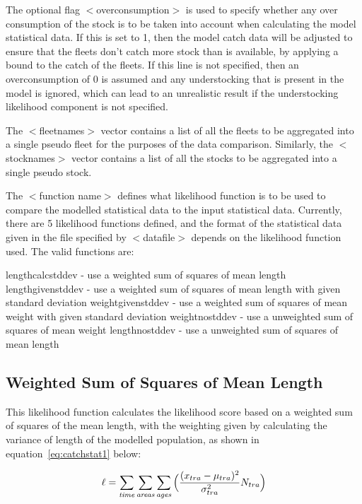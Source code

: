 \documentclass[10pt,twoside]{book}
\begin{document}
The optional flag $<$overconsumption$>$ is used to specify whether any over consumption of the stock is to be taken into account when calculating the model statistical data.  If this is set to 1, then the model catch data will be adjusted to ensure that the fleets don't catch more stock than is available, by applying a bound to the catch of the fleets.  If this line is not specified, then an overconsumption of 0 is assumed and any understocking that is present in the model is ignored, which can lead to an unrealistic result if the understocking likelihood component is not specified.

\bigskip
The $<$fleetnames$>$ vector contains a list of all the fleets to be aggregated into a single pseudo fleet for the purposes of the data comparison.  Similarly, the $<$stocknames$>$ vector contains a list of all the stocks to be aggregated into a single pseudo stock.

\bigskip
The $<$function name$>$ defines what likelihood function is to be used to compare the modelled statistical data to the input statistical data.  Currently, there are 5 likelihood functions defined, and the format of the statistical data given in the file specified by $<$datafile$>$ depends on the likelihood function used.  The valid functions are:

\bigskip
lengthcalcstddev - use a weighted sum of squares of mean length\newline
lengthgivenstddev - use a weighted sum of squares of mean length with given standard deviation\newline
weightgivenstddev - use a weighted sum of squares of mean weight with given standard deviation\newline
weightnostddev - use a unweighted sum of squares of mean weight\newline
lengthnostddev - use a unweighted sum of squares of mean length

\subsection{Weighted Sum of Squares of Mean Length}
This likelihood function calculates the likelihood score based on a weighted sum of squares of the mean length, with the weighting given by calculating the variance of length of the modelled population, as shown in equation~\ref{eq:catchstat1} below:

\begin{equation}\label{eq:catchstat1}
\ell = \sum_{\it time}\sum_{\it areas}\sum_{\it ages} \Big(\frac{(x_{tra}-\mu_{tra})^2} {\sigma_{tra}^2} N_{tra}\Big)
\end{equation}
\end{document}
